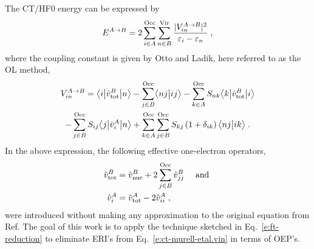 \documentclass[aip,jcp,amsmath,amssymb,reprint,floatfix]{revtex4-1}
\begin{document}
The CT/HF0 energy can be expressed
by\cite{Murrell.Randic.Williams.Longuet-Higgins.ProcRSocLondA.1965,Otto.Ladik.ChemPhys.1975}
%
\begin{equation} \label{e:ct-murell-etal.e}
 E^{A\rightarrow B} = 2 \sum_{i\in A}^{\rm Occ} \sum_{n\in B}^{\rm Vir} 
  \frac{\vert V^{A\rightarrow B}_{in} \vert^2 }{\varepsilon_i - \varepsilon_n} \;,
\end{equation}
%
%
where the coupling constant is given by Otto and Ladik,\cite{Otto.Ladik.ChemPhys.1975}
here referred to as the OL method,
%
\begin{multline} \label{e:ct-murell-etal.vin}
 V^{A\rightarrow B}_{in} = 
        \bigl\langle {i} \bigl\lvert {\hat{v}^B_{\rm tot} } \bigl\lvert {n} \bigr\rangle 
      - \sum_{j\in B}^{\rm Occ} \bigl\langle {nj} \bigl\lvert {ij} \bigr\rangle 
      - \sum_{k\in A}^{\rm Occ} S_{nk} \bigl\langle {k} \bigl\lvert {\hat{v}^B_{\rm tot} } \bigl\lvert {i} \bigr\rangle \\
      - \sum_{j\in B}^{\rm Occ} S_{ij} \bigl\langle {j} \bigl\lvert {\hat{v}^A_{i} } \bigl\lvert {n} \bigr\rangle  
     + \sum_{k\in A}^{\rm Occ} \sum_{j\in B}^{\rm Occ}  
        S_{kj} \left(1+\delta_{ik}\right) \bigl\langle {nj} \bigl\lvert {ik} \bigr\rangle \;.
\end{multline}
%
In the above expression, the following effective one\hyp{}electron operators,
%
\begin{subequations} 
\begin{align} \label{e:ct-murell-etal.vtot-vi}
 \hat{v}^B_{\rm tot} &= \hat{v}^B_{\rm nuc} + 2\sum_{j\in B}^{\rm Occ} \hat{v}^B_{jj} \quad\text{ and }\\ 
 \hat{v}^A_{i      } &= \hat{v}^A_{\rm tot} - 2\hat{v}^A_{ii} \;,
\end{align}
\end{subequations}
%
were introduced without making any approximation to the original equation
from Ref. 
The goal of this work is to apply the technique sketched in Eq.~\eqref{e:ft-reduction}
to eliminate ERI's from Eq.~\eqref{e:ct-murell-etal.vin} in terms of OEP's.
\end{document}
